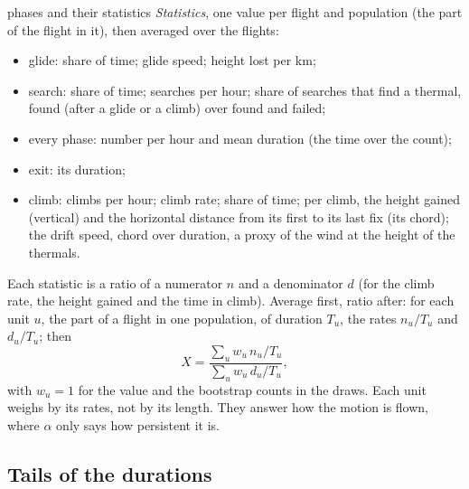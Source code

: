 \documentclass[10pt,a4paper]{article}
\begin{document}
\begin{method}{phases and their statistics}
  \emph{Statistics}, one value per flight and population (the part of the flight in it), then averaged over the
  flights:
  \begin{itemize}
  \item glide: share of time; glide speed; height lost per km;
  \item search: share of time; searches per hour; share of searches that find a thermal, found (after a glide or a
    climb) over found and failed;
  \item every phase: number per hour and mean duration (the time over the count);
  \item exit: its duration;
  \item climb: climbs per hour; climb rate; share of time; per climb, the height gained (vertical) and the
    horizontal distance from its first to its last fix (its chord); the drift speed, chord over duration, a proxy
    of the wind at the height of the thermals.
  \end{itemize}
  Each statistic is a ratio of a numerator $n$ and a denominator $d$ (for the climb rate, the height gained and
  the time in climb). Average first, ratio after: for each unit $u$, the part of a flight in one population, of
  duration $T_u$, the rates $n_u/T_u$ and $d_u/T_u$; then
  \[ X=\frac{\sum_u w_u\,n_u/T_u}{\sum_u w_u\,d_u/T_u}, \]
  with $w_u=1$ for the value and the bootstrap counts in the draws. Each unit weighs by its rates, not by its
  length. They answer how the motion is flown, where
  $\alpha$ only says how persistent it is.
\end{method}

\subsection{Tails of the durations}\label{tails}
\end{document}
